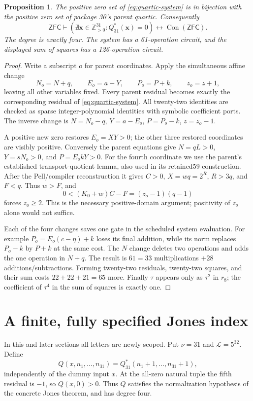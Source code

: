 \documentclass[11pt]{article}
\newtheorem{proposition}[theorem]{Proposition}
\theoremstyle{remark}\newtheorem{remark}[theorem]{Remark}
\newcommand{\Pos}{\mathbb Z_{>0}}\newcommand{\Q}{\mathbb Q}
\newcommand{\ZFC}{\mathsf{ZFC}}\newcommand{\Con}{\operatorname{Con}(\ZFC)}
\begin{document}
\begin{proposition}
The positive zero set of \eqref{eq:quartic-system} is in bijection with the
positive zero set of package 30's parent quartic. Consequently
\[
 \ZFC\vdash(\nexists\mathbf x\in\Pos^{31}:Q_{31}^{*}(\mathbf x)=0)
 \longleftrightarrow\Con.
\]
The degree is exactly four. The system has a 61-operation circuit, and
the displayed sum of squares has a 126-operation circuit.
\end{proposition}
\begin{proof}
Write a subscript $o$ for parent coordinates. Apply the simultaneous affine
change
\[
 N_o=N+q,\qquad E_o=a-Y,\qquad P_o=P+k,\qquad z_o=z+1,
\]
leaving all other variables fixed. Every parent residual becomes exactly
the corresponding residual of \eqref{eq:quartic-system}. All twenty-two
identities are checked as sparse integer-polynomial identities with symbolic
coefficient ports. The inverse change is
$N=N_o-q$, $Y=a-E_o$, $P=P_o-k$, $z=z_o-1$.

A positive new zero restores $E_o=XY>0$; the other three restored
coordinates are visibly positive. Conversely the parent equations give
$N=qL>0$, $Y=sN_o>0$, and $P=E_okY>0$. For the fourth coordinate we
use the parent's established transport-quotient lemma, also used in its
retained59 construction. After the Pell/compiler reconstruction it gives
$C>0$, $X=wq=2^R$, $R>3q$, and $F<q$. Thus $w>F$, and
\[
 0<(K_0+w)C-F=(z_o-1)(q-1)
\]
forces $z_o\ge2$. This is the necessary positive-domain argument; positivity
of $z_o$ alone would not suffice.

Each of the four changes saves one gate in the scheduled system evaluation.
For example $P_o=E_o(c-\eta)+k$ loses its final addition, while its norm
replaces $P_o-k$ by $P+k$ at the same cost. The $N$ change deletes two
operations and adds the one operation in $N+q$. The result is
$61=33$ multiplications $+28$ additions/subtractions. Forming twenty-two
residuals, twenty-two squares, and their sum costs $22+22+21=65$ more.
Finally $\tau$ appears only as $\tau^2$ in $r_8$; the coefficient of
$\tau^4$ in the sum of squares is exactly one.
\end{proof}

\section{A finite, fully specified Jones index}\label{sec:index}
In this and later sections all letters are newly scoped. Put $\nu=31$ and
$\mathcal L=5^{32}$. Define
\[
 Q(x,n_1,\ldots,n_{31})=
 Q_{31}^{*}(n_1+1,\ldots,n_{31}+1),
\]
independently of the dummy input $x$. At the all-zero natural tuple the fifth
residual is $-1$, so $Q(x,0)>0$. Thus $Q$ satisfies the normalization
hypothesis of the concrete Jones theorem, and has degree four.
\end{document}
